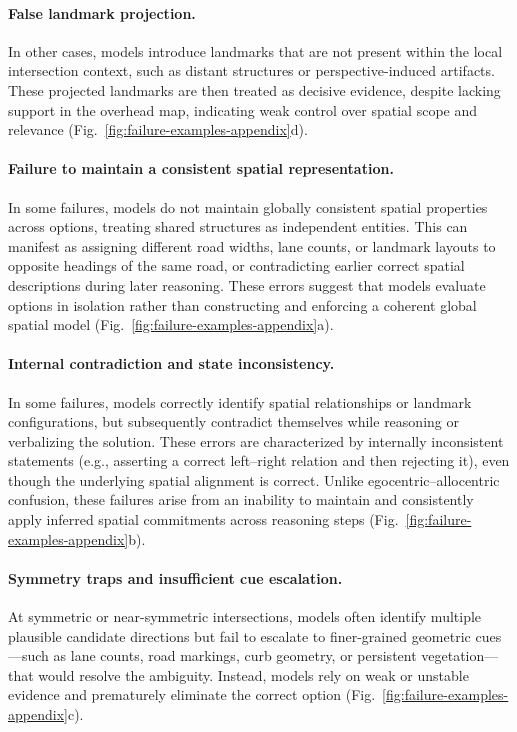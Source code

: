 \documentclass{article}
\begin{document}
\paragraph{False landmark projection.}
In other cases, models introduce landmarks that are not present within the local
intersection context, such as distant structures or perspective-induced artifacts.
These projected landmarks are then treated as decisive evidence, despite lacking
support in the overhead map, indicating weak control over spatial scope and
relevance (Fig.~\ref{fig:failure-examples-appendix}d).

\paragraph{Failure to maintain a consistent spatial representation.}
In some failures, models do not maintain globally consistent spatial properties
across options, treating shared structures as independent entities. This can
manifest as assigning different road widths, lane counts, or landmark layouts to
opposite headings of the same road, or contradicting earlier correct spatial
descriptions during later reasoning. These errors suggest that models evaluate
options in isolation rather than constructing and enforcing a coherent global
spatial model (Fig.~\ref{fig:failure-examples-appendix}a).

\paragraph{Internal contradiction and state inconsistency.}
In some failures, models correctly identify spatial relationships or landmark
configurations, but subsequently contradict themselves while reasoning or
verbalizing the solution. These errors are characterized by internally
inconsistent statements (e.g., asserting a correct left--right relation and then
rejecting it), even though the underlying spatial alignment is correct. Unlike
egocentric--allocentric confusion, these failures arise from an inability to
maintain and consistently apply inferred spatial commitments across reasoning
steps (Fig.~\ref{fig:failure-examples-appendix}b).

\paragraph{Symmetry traps and insufficient cue escalation.}
At symmetric or near-symmetric intersections, models often identify multiple
plausible candidate directions but fail to escalate to finer-grained geometric
cues—such as lane counts, road markings, curb geometry, or persistent vegetation—
that would resolve the ambiguity. Instead, models rely on weak or unstable
evidence and prematurely eliminate the correct option
(Fig.~\ref{fig:failure-examples-appendix}c).
\end{document}
